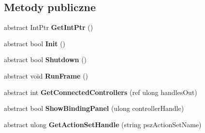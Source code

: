 \subsection*{Metody publiczne}
\begin{DoxyCompactItemize}
\item 
\mbox{\label{class_valve_1_1_steamworks_1_1_i_steam_controller_ae044b24127646d292bd403cb6a14fa4b}} 
abstract Int\+Ptr {\bfseries Get\+Int\+Ptr} ()
\item 
\mbox{\label{class_valve_1_1_steamworks_1_1_i_steam_controller_acd1b398fb59d81ccaf85f0a5dab79a38}} 
abstract bool {\bfseries Init} ()
\item 
\mbox{\label{class_valve_1_1_steamworks_1_1_i_steam_controller_a144f9f2c93d9b5d3113c7fb5c3e857dd}} 
abstract bool {\bfseries Shutdown} ()
\item 
\mbox{\label{class_valve_1_1_steamworks_1_1_i_steam_controller_a480c84be1fd08cb012b587a537c04345}} 
abstract void {\bfseries Run\+Frame} ()
\item 
\mbox{\label{class_valve_1_1_steamworks_1_1_i_steam_controller_a02db521e542c5c611c35a1cdcd96e404}} 
abstract int {\bfseries Get\+Connected\+Controllers} (ref ulong handles\+Out)
\item 
\mbox{\label{class_valve_1_1_steamworks_1_1_i_steam_controller_a8958152c3c263ec8bc4d1d356ff07fb3}} 
abstract bool {\bfseries Show\+Binding\+Panel} (ulong controller\+Handle)
\item 
\mbox{\label{class_valve_1_1_steamworks_1_1_i_steam_controller_abb2aa51f6f5cd7a87025c829d79d0073}} 
abstract ulong {\bfseries Get\+Action\+Set\+Handle} (string psz\+Action\+Set\+Name)
\item 
\mbox{\label{class_valve_1_1_steamworks_1_1_i_steam_controller_ab1a03842c9b245c3383dac4940c42fdf}} 

\end{DoxyCompactItemize}
